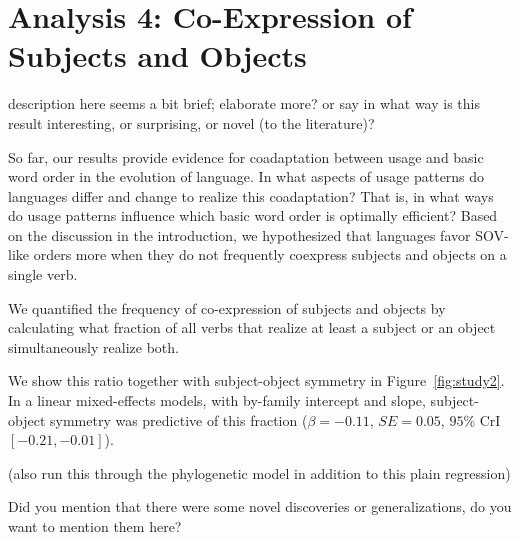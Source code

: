 \documentclass[11pt,a4paper]{article}
\newcommand\comment[1]{{\color{red}#1}}
\newcommand\mhahn[1]{{\color{red}(#1)}}
\begin{document}
\section{Analysis 4: Co-Expression of Subjects and Objects}

\comment{description here seems a bit brief; elaborate more? or say in what way is this result interesting, or surprising, or novel (to the literature)?}

So far, our results provide evidence for coadaptation between usage and basic word order in the evolution of language.
In what aspects of usage patterns do languages differ and change to realize this coadaptation?
That is, in what ways do usage patterns influence which basic word order is optimally efficient?
Based on the discussion in the introduction, we hypothesized that languages favor SOV-like orders more when they do not frequently coexpress subjects and objects on a single verb.

We quantified the frequency of co-expression of subjects and objects by calculating what fraction of all verbs that realize at least a subject or an object simultaneously realize both.

We show this ratio together with subject-object symmetry in Figure~\ref{fig:study2}.
In a linear mixed-effects models, with by-family intercept and slope, subject-object symmetry was predictive of this fraction ($\beta=-0.11$, $SE=0.05$, $95\%$ CrI $[-0.21, -0.01]$).

\mhahn{also run this through the phylogenetic model in addition to this plain regression}

{\color{blue}Did you mention that there were some novel discoveries or generalizations, do you want to mention them here?}
\end{document}
